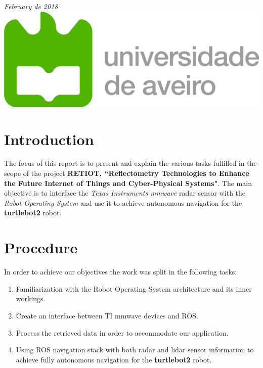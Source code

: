 \documentclass[12pt]{article}
\begin{document}
\begin{titlepage}
{\large \emph{February de 2018}}\\[2cm] %


\includegraphics[scale=0.4]{ua_logo.png} %
 

\vfill %

\end{titlepage}
\tableofcontents
\newpage

\section{Introduction}
The focus of this report is to present and explain the various tasks fulfilled in the scope of the project \textbf{RETIOT, “Reflectometry Technologies to Enhance the Future Internet of Things and Cyber-Physical Systems"}. The main objective is to interface the \textit{Texas Instruments mmwave} radar sensor with the \textit{Robot Operating System} and use it to achieve autonomous navigation for the \textbf{turtlebot2} robot.


\section{Procedure}
In order to achieve our objectives the work was split in the following tasks:
\begin{enumerate}
    \item Familiarization with the Robot Operating System architecture and its inner workings.
    \item Create an interface between TI mmwave devices and ROS.
    \item Process the retrieved data in order to  accommodate our application.
    \item Using ROS navigation stack with both radar and lidar sensor information to achieve fully autonomous navigation for the \textbf{turtlebot2} robot.
\end{enumerate}
\end{document}
